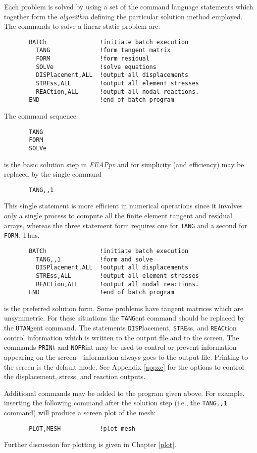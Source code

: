 Each problem is solved by using a set of the command language statements
which together form the {\it algorithm} defining the particular solution
method employed.  The commands to solve a linear static problem are:
\begin{verbatim}
       BATCh               !initiate batch execution
         TANG              !form tangent matrix
         FORM              !form residual
         SOLVe             !solve equations
         DISPlacement,ALL  !output all displacements
         STREss,ALL        !output all element stresses
         REACtion,ALL      !output all nodal reactions.
       END                 !end of batch program
\end{verbatim}
The command sequence
\begin{verbatim}
       TANG
       FORM
       SOLVe
\end{verbatim}
is the basic solution step in {\sl FEAPpv} and for simplicity (and efficiency)
may be replaced by the single command
\begin{verbatim}
       TANG,,1
\end{verbatim}
This single statement is more efficient in numerical operations
since it involves only a single
process to compute all the finite element tangent and residual arrays,
whereas the three
statement form requires one for {\tt TANG} and a second for {\tt FORM}.
Thus,
\begin{verbatim}
       BATCh               !initiate batch execution
         TANG,,1           !form and solve
         DISPlacement,ALL  !output all displacements
         STREss,ALL        !output all element stresses
         REACtion,ALL      !output all nodal reactions.
       END                 !end of batch program
\end{verbatim}
is the preferred solution form.
Some problems have tangent matrices which are unsymmetric.  For these situations
the {\tt TANG}ent command should be replaced by the {\tt UTAN}gent command.
The statements {\tt DISP}lacement, {\tt STRE}ss, and {\tt REAC}tion control
information which is written to the output file and to the screen.
The commands {\tt PRIN}t and {\tt NOPR}int may be used to control or prevent
information appearing on the screen - information always goes to the
output file.  Printing to the screen is the default mode.  See Appendix \ref{appxc}
for the options to control the displacement, stress, and reaction outputs.

Additional commands may be added to the program given above.  For example,
inserting the following command after the solution step (i.e., the
{\tt TANG,,1} command) will produce a screen plot of the mesh:
\begin{verbatim}
       PLOT,MESH           !plot mesh
\end{verbatim}
Further discussion for plotting is given in Chapter \ref{plot}.

